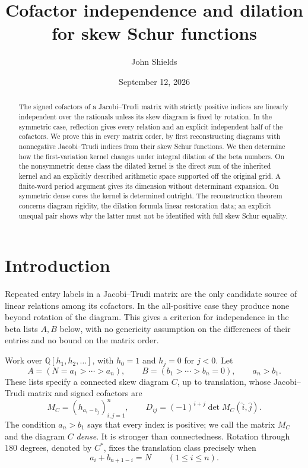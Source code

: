 \documentclass[11pt,a4paper]{amsart}
\title{Cofactor independence and dilation\\
for skew Schur functions}
\author{John Shields}
\date{September 12, 2026}
\numberwithin{equation}{section}
\theoremstyle{plain}
\theoremstyle{definition}
\newcommand{\Q}{\mathbb Q}
\begin{document}
\begin{abstract}
The signed cofactors of a Jacobi--Trudi matrix with strictly positive indices are linearly independent over the rationals unless its skew diagram is fixed by rotation.  In the symmetric case, reflection gives every relation and an explicit independent half of the cofactors.  We prove this in every matrix order, by first reconstructing diagrams with nonnegative Jacobi--Trudi indices from their skew Schur functions.  We then determine how the first-variation kernel changes under integral dilation of the beta numbers.  On the nonsymmetric dense class the dilated kernel is the direct sum of the inherited kernel and an explicitly described arithmetic space supported off the original grid.  A finite-word period argument gives its dimension without determinant expansion.  On symmetric dense cores the kernel is determined outright.  The reconstruction theorem concerns diagram rigidity, the dilation formula linear restoration data; an explicit unequal pair shows why the latter must not be identified with full skew Schur equality.
\end{abstract}

\maketitle

\section{Introduction}

Repeated entry labels in a Jacobi--Trudi matrix are the only candidate source
of linear relations among its cofactors.  In the all-positive case they
produce none beyond rotation of the diagram.  This gives a criterion for
independence in the beta lists \(A,B\) below, with no genericity assumption on
the differences of their entries and no bound on the matrix order.

Work over \(\Q[h_1,h_2,\ldots]\), with \(h_0=1\) and \(h_j=0\) for
\(j<0\).  Let
\[
 A=(N=a_1>\cdots>a_n),\qquad
 B=(b_1>\cdots>b_n=0),\qquad a_n>b_1.
\]
These lists specify a connected skew diagram \(C\), up to translation, whose
Jacobi--Trudi matrix and signed cofactors are
\[
 M_C=(h_{a_i-b_j})_{i,j=1}^n,
 \qquad D_{ij}=(-1)^{i+j}\det M_C(\widehat i,\widehat j).
\]
The condition \(a_n>b_1\) says that every index is positive; we call the
matrix \(M_C\) and the diagram \(C\) \emph{dense}.  It is stronger than
connectedness.  Rotation through \(180\) degrees, denoted by \(C^*\), fixes
the translation class precisely when
\begin{equation}\label{eq:rotation-condition}
 a_i+b_{n+1-i}=N\qquad(1\le i\le n).
\end{equation}
\end{document}

